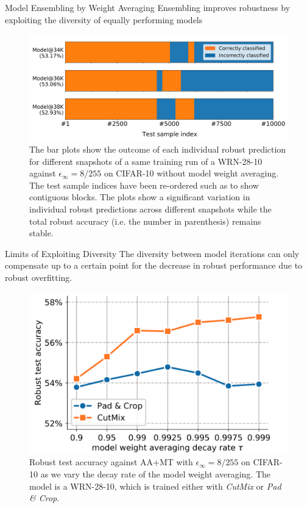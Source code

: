 \begin{frame}{Model Ensembling by Weight Averaging}
    Ensembling improves robustness by exploiting the diversity of equally performing models 
    \begin{figure}
        \centering
        \includegraphics[width=\linewidth]{pic/fig 7.png}
        \caption{The bar plots show the outcome of each individual robust prediction for different snapshots of a same training run of a WRN-28-10 against $\epsilon_\infty = 8/255$ on CIFAR-10 without model weight averaging. The test sample indices have been re-ordered such as to show contiguous blocks. The plots show a significant variation in individual robust predictions across different snapshots while the total robust accuracy (i.e. the number in parenthesis) remains stable.}
        \label{fig:fig7}
    \end{figure}
\end{frame}

\begin{frame}{Limits of Exploiting Diversity}
The diversity between model iterations can only compensate up to a certain point for the decrease in robust performance due to robust overfitting.
    \begin{figure}
            \centering
            \includegraphics[width=0.7\linewidth]{pic/fig 8.png}
            \caption{Robust test accuracy against AA+MT with $\epsilon_\infty = 8/255$ on CIFAR-10 as we vary the decay rate of the model weight averaging. The model is a WRN-28-10, which is trained either with \textit{CutMix} or \textit{Pad \& Crop}.}
            \label{fig:fig8}
    \end{figure}
\end{frame}


